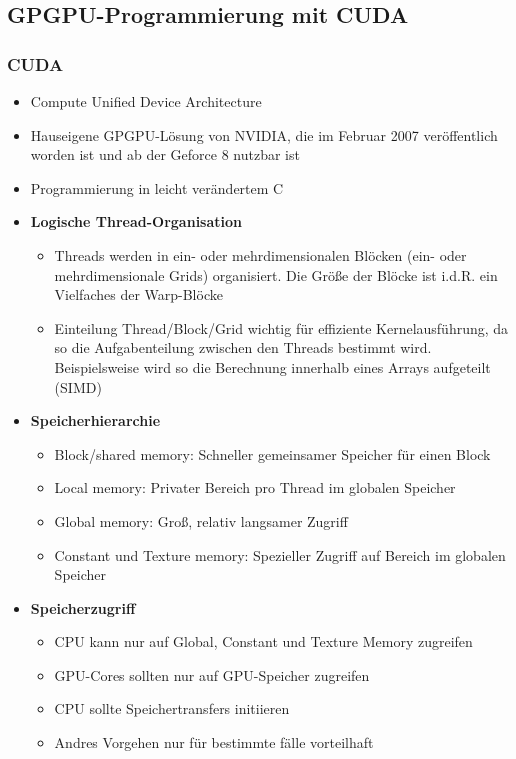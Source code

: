 \subsection{GPGPU-Programmierung mit CUDA}

\subsubsection{CUDA}
\begin{itemize}
	\item Compute Unified Device Architecture
	\item Hauseigene GPGPU-Lösung von NVIDIA, die im Februar 2007 veröffentlich worden ist und ab der Geforce 8 nutzbar ist
	\item Programmierung in leicht verändertem C
	\item \textbf{Logische Thread-Organisation}
	\begin{itemize}
		\item Threads werden in ein- oder mehrdimensionalen Blöcken (ein- oder mehrdimensionale Grids) organisiert. Die Größe der Blöcke ist i.d.R. ein Vielfaches der Warp-Blöcke
		\item Einteilung Thread/Block/Grid wichtig für effiziente Kernelausführung, da so die Aufgabenteilung zwischen den Threads bestimmt wird. Beispielsweise wird so die Berechnung innerhalb eines Arrays aufgeteilt (SIMD)
	\end{itemize}
	\item \textbf{Speicherhierarchie}
	\begin{itemize}
		\item Block/shared memory: Schneller gemeinsamer Speicher für einen Block
		\item Local memory: Privater Bereich pro Thread im globalen Speicher
		\item Global memory: Groß, relativ langsamer Zugriff
		\item Constant und Texture memory: Spezieller Zugriff auf Bereich im globalen Speicher
	\end{itemize}
	\item \textbf{Speicherzugriff}
	\begin{itemize}
		\item CPU kann nur auf Global, Constant und Texture Memory zugreifen
		\item GPU-Cores sollten nur auf GPU-Speicher zugreifen
		\item CPU sollte Speichertransfers initiieren
		\item Andres Vorgehen nur für bestimmte fälle vorteilhaft

\end{itemize}
\end{itemize}
